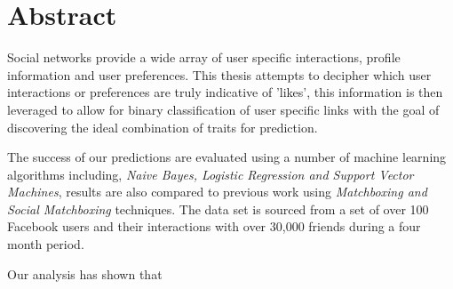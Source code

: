 
\chapter*{Abstract}
\label{cha:abstract}

Social networks provide a wide array of user specific interactions, profile information and user preferences.
This thesis attempts to decipher which user interactions or preferences are truly indicative of 'likes', this 
information is then leveraged to allow for binary classification of user specific links with the goal of discovering the 
ideal combination of traits for prediction.

The success of our predictions are evaluated using a number of machine learning algorithms including, 
\emph{Naive Bayes, Logistic Regression and Support Vector Machines}, results are also compared to previous work 
using \emph{Matchboxing and Social Matchboxing} techniques. The data set is sourced from a set of over 100 Facebook 
users and their interactions with over 30,000 friends during a four month period.

Our analysis has shown that 

